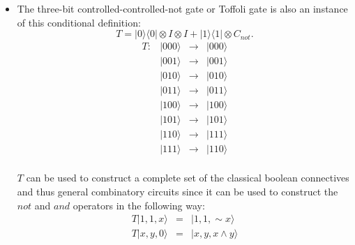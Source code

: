 \documentclass{article}
\def\pagedone{\newpage}
\def\ket#1{|{#1}\rangle}
\def\bra#1{\langle{#1}|}
\begin{document}
\begin{itemize}
\pagedone

\item
The three-bit controlled-controlled-{\sc not} 
gate or Toffoli gate is also an 
instance of this conditional definition:
$$T = \ket 0\bra 0\otimes I \otimes I + \ket 1\bra 1 \otimes C_{not}.$$
 $$\begin{array}{lrcl}
 T:	& \ket{000} & \to & \ket{000}\\
         & \ket{001} & \to & \ket{001}\\
         & \ket{010} & \to & \ket{010}\\
         & \ket{011} & \to & \ket{011}\\
 	& \ket{100} & \to & \ket{100}\\
         & \ket{101} & \to & \ket{101}\\
         & \ket{110} & \to & \ket{111}\\
         & \ket{111} & \to & \ket{110}\\
 \end{array}$$
 
$T$ can be used to construct a complete set of the classical boolean connectives and thus general combinatory circuits since
it can be used to construct the $not$ and $and$ operators in the
following way:
\begin{eqnarray*}
T\ket{1, 1, x} & = & \ket{1, 1, \sim x}\\
T\ket{x, y, 0} & = & \ket{x, y, x \wedge y}\\
\end{eqnarray*}

\end{itemize}

\pagedone


\end{document}
